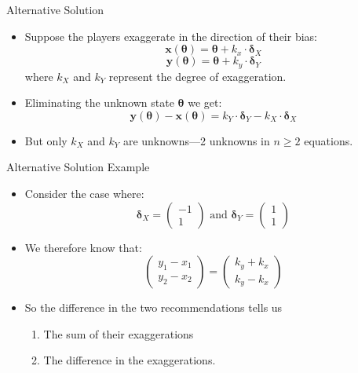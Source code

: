 \documentclass{beamer}
\begin{document}
\begin{frame}{Alternative Solution}
	\begin{itemize}
		\item Suppose the players exaggerate in the direction of their bias:
		$$\mathbf{x}(\boldsymbol{\theta})=\boldsymbol{\theta}+k_x \cdot \boldsymbol{\delta}_X $$
		$$\mathbf{y}(\boldsymbol{\theta})=\boldsymbol{\theta}+k_y \cdot \boldsymbol{\delta}_Y $$
		where $k_X$ and $k_Y$ represent the degree of exaggeration.\pause
		\item Eliminating the unknown state $\boldsymbol{\theta}$ we get:
		$$\mathbf{y}(\boldsymbol{\theta})-\mathbf{x}(\boldsymbol{\theta})=k_Y \cdot \boldsymbol{\delta}_Y-k_X \cdot \boldsymbol{\delta}_X$$ \pause
		\item But only $k_X$ and $k_Y$ are unknowns---2 unknowns in $n\geq2$ equations.\pause

	\end{itemize}
\end{frame}
\begin{frame}{Alternative Solution Example}
	\begin{itemize}
		\item Consider the case where:
		$$\boldsymbol{\delta}_X=\left( \begin{array}{c} -1 \\ 1 \end{array} \right)\text{ and } \boldsymbol{\delta}_Y=\left( \begin{array}{c} 1 \\ 1\end{array}\right)$$\pause
		\item We therefore know that:
		$$\left(\begin{array}{r} y_1-x_1 \\ y_2-x_2 \end{array}\right) =\left(\begin{array}{r} k_y+k_x \\ k_y-k_x \end{array}\right)$$\pause
		\item So the difference in the two recommendations tells us
		\begin{enumerate}
			\item The sum of their exaggerations
			\item The difference in the exaggerations.
		\end{enumerate}
	\end{itemize}
\end{frame}
\end{document}
